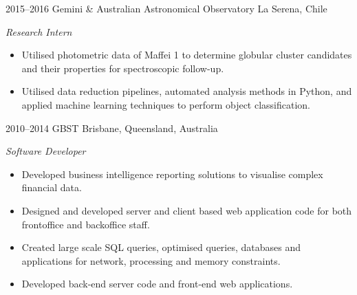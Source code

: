 \begin{entrylist}
\entry
{2015--2016}
{Gemini \& Australian Astronomical Observatory}
{La Serena, Chile}
{\emph{Research Intern}
\begin{itemize}
\item Utilised photometric data of Maffei 1 to determine globular cluster candidates and their properties for spectroscopic follow-up. 
\item Utilised data reduction pipelines, automated analysis methods in Python, and applied machine learning techniques to perform 
object classification.
\end{itemize}
}

\entry
{2010--2014}
{GBST}
{Brisbane, Queensland, Australia}
{\emph{Software Developer}
\begin{itemize}
\item Developed business intelligence reporting solutions to visualise complex financial data.
\item Designed and developed server and client based web application code for both frontoffice and backoffice staff.
\item Created large scale SQL queries, optimised queries, databases and applications for network, processing and memory constraints.
\item Developed back-end server code and front-end web applications.
\end{itemize}
}


\end{entrylist}





